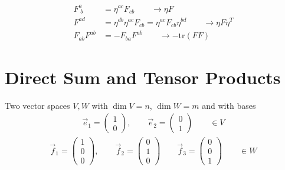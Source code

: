 \documentclass[../main.tex]{subfiles}
\begin{document}
\begin{align}
F^a_{\;b}&=\eta^{ac}F_{cb}\qquad\rightarrow \eta F\\
F^{ad}&=\eta^{db}\eta^{ac}F_{cb}=\eta^{ac}F_{cb}\eta^{bd}\qquad\rightarrow \eta F\eta^T\\
F_{ab}F^{ab}&=-F_{ba}F^{ab}\qquad\rightarrow-\text{tr}(F F)
\end{align}

\section{Direct Sum and Tensor Products}
Two vector spaces $V, W$ with $\dim V=n$, $\dim W=m$ and with bases
\begin{align}
\vec{e}_1=\left(\begin{array}{c}
1\\
0
\end{array}\right),\qquad
\vec{e}_2=\left(\begin{array}{c}
0\\
1
\end{array}\right)\qquad\in V
\end{align}
\begin{align}
\vec{f}_1=\left(\begin{array}{c}
1\\
0\\
0
\end{array}\right),\qquad
\vec{f}_2=\left(\begin{array}{c}
0\\
1\\
0
\end{array}\right)\qquad
\vec{f}_3=\left(\begin{array}{c}
0\\
0\\
1
\end{array}\right)\qquad\in W
\end{align}
\end{document}

